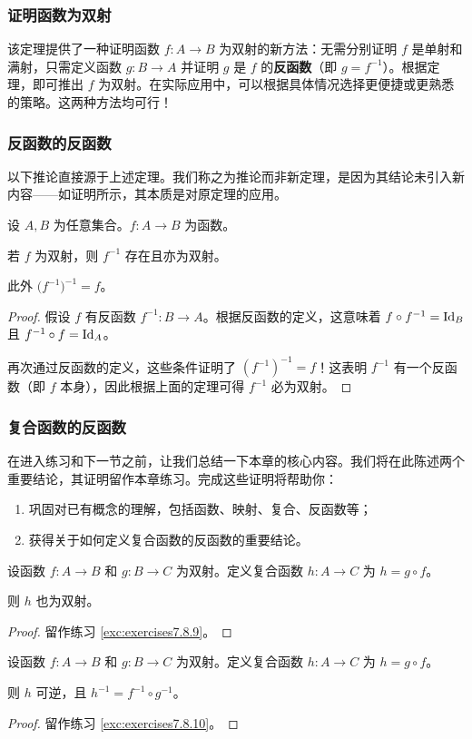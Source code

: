 \subsubsection*{证明函数为双射}

该定理提供了一种证明函数 $f : A \to B$ 为双射的新方法：无需分别证明 $f$ 是单射和满射，只需定义函数 $g : B \to A$ 并证明 $g$ 是 $f$ 的\textbf{反函数}（即 $g = f^{-1}$）。根据定理，即可推出 $f$ 为双射。在实际应用中，可以根据具体情况选择更便捷或更熟悉的策略。这两种方法均可行！

\subsubsection*{反函数的反函数}

以下推论直接源于上述定理。我们称之为推论而非新定理，是因为其结论未引入新内容——如证明所示，其本质是对原定理的应用。

\begin{corollary}
    设 $A, B$ 为任意集合。$f : A \to B$ 为函数。

    若 $f$ 为双射，则 $f^{-1}$ 存在且亦为双射。

    此外 $\big(f^{-1}\big)^{-1} = f$。
\end{corollary}

\begin{proof}
    假设 $f$ 有反函数 $f^{-1} : B \to A$。根据反函数的定义，这意味着 $f \circ f^{-1} = \text{Id}_B$ 且 $f^{-1} \circ f = \text{Id}_A$。

    再次通过反函数的定义，这些条件证明了 $(f^{-1})^{-1}=f$！这表明 $f^{-1}$ 有一个反函数（即 $f$ 本身），因此根据上面的定理可得 $f^{-1}$ 必为双射。
\end{proof}

\subsubsection*{复合函数的反函数}

在进入练习和下一节之前，让我们总结一下本章的核心内容。我们将在此陈述两个重要结论，其证明留作本章练习。完成这些证明将帮助你：
\begin{enumerate}[label=(\alph*)]
    \item 巩固对已有概念的理解，包括函数、映射、复合、反函数等；
    \item 获得关于如何定义复合函数的反函数的重要结论。
\end{enumerate}

\begin{proposition}
    设函数 $f : A \to B$ 和 $g : B \to C$ 为双射。定义复合函数 $h : A \to C$ 为 $h = g \circ f$。
    
    则 $h$ 也为双射。
\end{proposition}

\begin{proof}
    留作练习 \ref{exc:exercises7.8.9}。
\end{proof}

\begin{proposition}
    设函数 $f : A \to B$ 和 $g : B \to C$ 为双射。定义复合函数 $h : A \to C$ 为 $h = g \circ f$。
    
    则 $h$ 可逆，且 $h^{-1} = f^{-1} \circ g^{-1}$。
\end{proposition}

\begin{proof}
    留作练习 \ref{exc:exercises7.8.10}。
\end{proof}